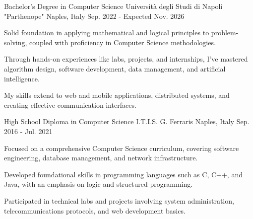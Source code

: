 
\begin{cventries}

	\cventry
	{Bachelor's Degree in Computer Science} %
	{Università degli Studi di Napoli "Parthenope"} %
	{Naples, Italy} %
	{Sep. 2022 - Expected Nov. 2026} %
	{
		\begin{cvitems} %
			\item {Solid foundation in applying mathematical and logical principles to problem-solving, coupled with proficiency in Computer Science methodologies.}
			\item {Through hands-on experiences like labs, projects, and internships, I've mastered algorithm design, software development, data management, and artificial intelligence.}
			\item {My skills extend to web and mobile applications, distributed systems, and creating effective communication interfaces.}
		\end{cvitems}
	}

	\cventry
	{High School Diploma in Computer Science} %
	{I.T.I.S. G. Ferraris} %
	{Naples, Italy} %
	{Sep. 2016 - Jul. 2021} %
	{
		\begin{cvitems} %
			\item {Focused on a comprehensive Computer Science curriculum, covering software engineering, database management, and network infrastructure.}
			\item {Developed foundational skills in programming languages such as C, C++, and Java, with an emphasis on logic and structured programming.}
			\item {Participated in technical labs and projects involving system administration, telecommunications protocols, and web development basics.}
		\end{cvitems}
	}

\end{cventries}
